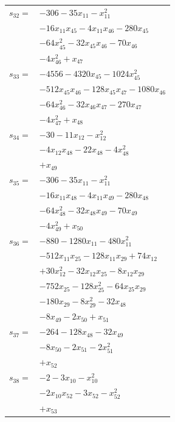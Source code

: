 \begin{longtable}{@{}r@{\;}l@{}}
\(s_{32}=\) & \(\displaystyle -306 -35x_{11} -x_{11}^{2}\) \\
 & \(\displaystyle -16x_{11}x_{45} -4x_{11}x_{46} -280x_{45}\) \\
 & \(\displaystyle -64x_{45}^{2} -32x_{45}x_{46} -70x_{46}\) \\
 & \(\displaystyle -4x_{46}^{2} +x_{47}\) \\[3pt]
\(s_{33}=\) & \(\displaystyle -4556 -4320x_{45} -1024x_{45}^{2}\) \\
 & \(\displaystyle -512x_{45}x_{46} -128x_{45}x_{47} -1080x_{46}\) \\
 & \(\displaystyle -64x_{46}^{2} -32x_{46}x_{47} -270x_{47}\) \\
 & \(\displaystyle -4x_{47}^{2} +x_{48}\) \\[3pt]
\(s_{34}=\) & \(\displaystyle -30 -11x_{12} -x_{12}^{2}\) \\
 & \(\displaystyle -4x_{12}x_{48} -22x_{48} -4x_{48}^{2}\) \\
 & \(\displaystyle +x_{49}\) \\[3pt]
\(s_{35}=\) & \(\displaystyle -306 -35x_{11} -x_{11}^{2}\) \\
 & \(\displaystyle -16x_{11}x_{48} -4x_{11}x_{49} -280x_{48}\) \\
 & \(\displaystyle -64x_{48}^{2} -32x_{48}x_{49} -70x_{49}\) \\
 & \(\displaystyle -4x_{49}^{2} +x_{50}\) \\[3pt]
\(s_{36}=\) & \(\displaystyle -880 -1280x_{11} -480x_{11}^{2}\) \\
 & \(\displaystyle -512x_{11}x_{25} -128x_{11}x_{29} +74x_{12}\) \\
 & \(\displaystyle +30x_{12}^{2} -32x_{12}x_{25} -8x_{12}x_{29}\) \\
 & \(\displaystyle -752x_{25} -128x_{25}^{2} -64x_{25}x_{29}\) \\
 & \(\displaystyle -180x_{29} -8x_{29}^{2} -32x_{48}\) \\
 & \(\displaystyle -8x_{49} -2x_{50} +x_{51}\) \\[3pt]
\(s_{37}=\) & \(\displaystyle -264 -128x_{48} -32x_{49}\) \\
 & \(\displaystyle -8x_{50} -2x_{51} -2x_{51}^{2}\) \\
 & \(\displaystyle +x_{52}\) \\[3pt]
\(s_{38}=\) & \(\displaystyle -2 -3x_{10} -x_{10}^{2}\) \\
 & \(\displaystyle -2x_{10}x_{52} -3x_{52} -x_{52}^{2}\) \\
 & \(\displaystyle +x_{53}\) \\[3pt]

\end{longtable}
